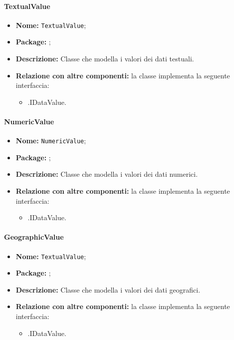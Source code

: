 \paragraph{TextualValue}
\begin{itemize}
\item \textbf{Nome:} \texttt{TextualValue};
\item \textbf{Package:} \texttt{\smodel{}};
\item \textbf{Descrizione:} Classe che modella i valori dei dati testuali.
\item \textbf{Relazione con altre componenti:} la classe implementa la seguente interfaccia:
		\begin{itemize}
			\item \smodel{}.IDataValue.
		\end{itemize}
\end{itemize}

\paragraph{NumericValue}
\begin{itemize}
\item \textbf{Nome:} \texttt{NumericValue};
\item \textbf{Package:} \texttt{\smodel{}};
\item \textbf{Descrizione:} Classe che modella i valori dei dati numerici.
\item \textbf{Relazione con altre componenti:} la classe implementa la seguente interfaccia:
		\begin{itemize}
			\item \smodel{}.IDataValue.
		\end{itemize}
\end{itemize}

\paragraph{GeographicValue}
\begin{itemize}
\item \textbf{Nome:} \texttt{TextualValue};
\item \textbf{Package:} \texttt{\smodel{}};
\item \textbf{Descrizione:} Classe che modella i valori dei dati geografici.
\item \textbf{Relazione con altre componenti:} la classe implementa la seguente interfaccia:
		\begin{itemize}
			\item \smodel{}.IDataValue.
		\end{itemize}
\end{itemize}

